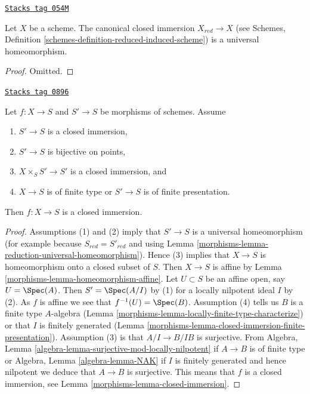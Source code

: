 \begin{lemma}
\label{morphisms-lemma-reduction-universal-homeomorphism}
\href{https://stacks.math.columbia.edu/tag/054M}{\texttt{Stacks tag 054M}}

Let $X$ be a scheme. The canonical closed immersion $X_{red} \to X$ (see
Schemes, Definition \ref{schemes-definition-reduced-induced-scheme})
is a universal homeomorphism.
\end{lemma}

\begin{proof}
Omitted.
\end{proof}

\begin{lemma}
\label{morphisms-lemma-check-closed-infinitesimally}
\href{https://stacks.math.columbia.edu/tag/0896}{\texttt{Stacks tag 0896}}

Let $f : X \to S$ and $S' \to S$ be morphisms of schemes.
Assume
\begin{enumerate}
\item $S' \to S$ is a closed immersion,
\item $S' \to S$ is bijective on points,
\item $X \times_S S' \to S'$ is a closed immersion, and
\item $X \to S$ is of finite type or $S' \to S$ is of finite presentation.
\end{enumerate}
Then $f : X \to S$ is a closed immersion.
\end{lemma}

\begin{proof}

Assumptions (1) and (2) imply that $S' \to S$ is a universal homeomorphism
(for example because $S_{red} = S'_{red}$ and using
Lemma \ref{morphisms-lemma-reduction-universal-homeomorphism}).
Hence (3) implies that $X \to S$ is homeomorphism onto a
closed subset of $S$. Then $X \to S$ is affine by
Lemma \ref{morphisms-lemma-homeomorphism-affine}.
Let $U \subset S$ be an affine open, say $U = \Spec(A)$. Then $S' = \Spec(A/I)$
by (1) for a locally nilpotent ideal $I$ by (2). As $f$ is affine we see that
$f^{-1}(U) = \Spec(B)$.
Assumption (4) tells us $B$ is a finite type $A$-algebra
(Lemma \ref{morphisms-lemma-locally-finite-type-characterize}) or
that $I$ is finitely generated
(Lemma \ref{morphisms-lemma-closed-immersion-finite-presentation}).
Assumption (3) is that $A/I \to B/IB$ is surjective. From
Algebra, Lemma \ref{algebra-lemma-surjective-mod-locally-nilpotent}
if $A \to B$ is of finite type
or Algebra, Lemma \ref{algebra-lemma-NAK} if $I$ is finitely generated
and hence nilpotent we deduce that $A \to B$ is surjective.
This means that $f$ is a closed immersion, see
Lemma \ref{morphisms-lemma-closed-immersion}.
\end{proof}


